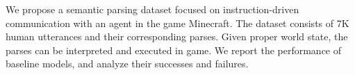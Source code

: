 We propose a semantic parsing dataset focused on instruction-driven communication with an agent in the game Minecraft. The dataset consists of 7K human utterances and their corresponding parses. Given proper world state, the parses can be interpreted and executed in game. We report the performance of baseline models, and analyze their successes and failures.
